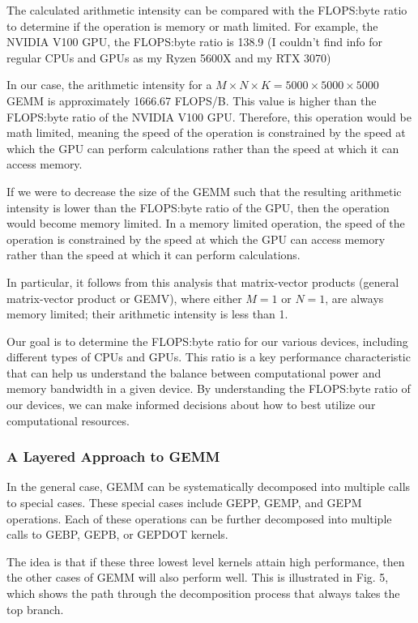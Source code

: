The calculated arithmetic intensity can be compared with the FLOPS:byte ratio to determine if the operation is memory or math limited. For example, the NVIDIA V100 GPU, the FLOPS:byte ratio is 138.9 (I couldn't find info for regular CPUs and GPUs as my Ryzen 5600X and my RTX 3070)

In our case, the arithmetic intensity for a $M \times N \times K = 5000 \times 5000 \times 5000$ GEMM is approximately 1666.67 FLOPS/B. This value is higher than the FLOPS:byte ratio of the NVIDIA V100 GPU. Therefore, this operation would be math limited, meaning the speed of the operation is constrained by the speed at which the GPU can perform calculations rather than the speed at which it can access memory.

If we were to decrease the size of the GEMM such that the resulting arithmetic intensity is lower than the FLOPS:byte ratio of the GPU, then the operation would become memory limited. In a memory limited operation, the speed of the operation is constrained by the speed at which the GPU can access memory rather than the speed at which it can perform calculations.

In particular, it follows from this analysis that matrix-vector products (general matrix-vector product or GEMV), where either $M=1$ or $N=1$, are always memory limited; their arithmetic intensity is less than 1.

Our goal is to determine the FLOPS:byte ratio for our various devices, including different types of CPUs and GPUs. This ratio is a key performance characteristic that can help us understand the balance between computational power and memory bandwidth in a given device. By understanding the FLOPS:byte ratio of our devices, we can make informed decisions about how to best utilize our computational resources.

\subsubsection{A Layered Approach to GEMM}
In the general case, GEMM can be systematically decomposed into multiple calls to special cases. These special cases include GEPP, GEMP, and GEPM operations. Each of these operations can be further decomposed into multiple calls to GEBP, GEPB, or GEPDOT kernels.

The idea is that if these three lowest level kernels attain high performance, then the other cases of GEMM will also perform well. This is illustrated in Fig. 5, which shows the path through the decomposition process that always takes the top branch.

